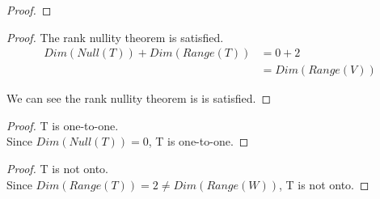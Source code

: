 \documentclass[12pt]{article}
\newenvironment{exercise}[2][Exercise]{\begin{trivlist}
\item[\hskip \labelsep{\bfseries #1}\hskip \labelsep{\bfseries #2.}]}{\end{trivlist}}
\begin{document}
\begin{exercise}{2.1.3}
\begin{proof}
    \end{proof}

    \begin{proof} The rank nullity theorem is satisfied. \\

        \begin{align*}
            Dim(Null(T)) + Dim(Range(T))
            &= 0 + 2 \\
            &= Dim(Range(V))
        \end{align*}
        
        \noindent We can see the rank nullity theorem is is satisfied.

    \end{proof}

    \begin{proof} T is one-to-one. \\

        \noindent Since $Dim(Null(T)) = 0$, T is one-to-one.

    \end{proof}

    \begin{proof} T is not onto. \\

        \noindent Since $Dim(Range(T)) = 2 \neq Dim(Range(W))$, T is not onto.

    \end{proof}

\end{exercise}
\end{document}
